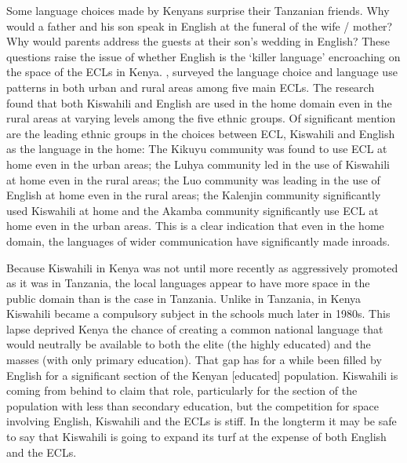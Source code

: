 \documentclass[output=paper,colorlinks,citecolor=brown]{langscibook}
\begin{document}
Some language choices made by Kenyans surprise their Tanzanian friends. Why would a father and his son speak in English at the funeral of the wife / mother? Why would parents address the guests at their son’s wedding in English? These questions raise the issue of whether English is the ‘killer language’ encroaching on the space of the ECLs in Kenya.  \cite{MuthwiiKioko2002}, surveyed the language choice and language use patterns in both urban and rural areas among five main ECLs.  The research found that both Kiswahili and English are used in the home domain even in the rural areas at varying levels among the five ethnic groups.  Of significant mention are the leading ethnic groups in the choices between ECL, Kiswahili and English as the language in the home: The Kikuyu community was found to use ECL at home even in the urban areas; the Luhya community led in the use of Kiswahili at home even in the rural areas; the Luo community was leading in the use of English at home even in the rural areas; the Kalenjin community significantly used Kiswahili at home and the Akamba community significantly use ECL at home even in the urban areas.   This is a clear indication that even in the home domain, the languages of wider communication have significantly made inroads.

Because Kiswahili in Kenya was not until more recently as aggressively promoted as it was in Tanzania, the local languages appear to have more space in the public domain than is the case in Tanzania. Unlike in Tanzania, in Kenya Kiswahili became a compulsory subject in the schools much later in 1980s. This lapse deprived Kenya the chance of creating a common national language that would neutrally be available to both the elite (the highly educated) and the masses (with only primary education).  That gap has for a while been filled by English for a significant section of the Kenyan [educated] population.  Kiswahili is coming from behind to claim that role, particularly for the section of the population with less than secondary education, but the competition for space involving English, Kiswahili and the ECLs is stiff. In the longterm it may be safe to say that Kiswahili is going to expand its turf at the expense of both English and the ECLs.  
\end{document}
